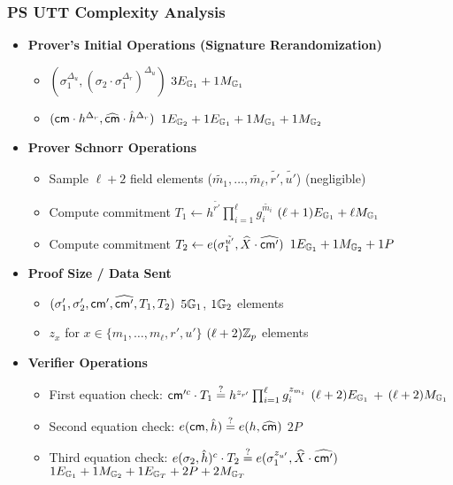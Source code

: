 {\subsubsection{PS UTT Complexity Analysis \cite{tomescu2022utt}}
\begin{itemize}
    \item \textbf{Prover's Initial Operations (Signature Rerandomization)}
    \begin{itemize}
        \item $(\sigma_1^{\Delta_u}, (\sigma_2\cdot \sigma_1^{\Delta_r})^{\Delta_u})$ \qquad $3E_{\mathbb{G}_1} + 1M_{\mathbb{G}_1}$
        \item $(\mathsf{cm} \cdot h^{\Delta_r}, \widehat{\mathsf{cm}} \cdot \hat{h}^{\Delta_r})$ \qquad $1E_{\mathbb{G}_2} + 1E_{\mathbb{G}_1} + 1M_{\mathbb{G}_1} + 1M_{\mathbb{G}_2}$
    \end{itemize}
\item \textbf{Prover Schnorr Operations}
    \begin{itemize}
        \item Sample $\ell+2$ field elements ($\tilde{m_1},\ldots,\tilde{m_\ell}, \tilde{r'}, \tilde{u'}$) \qquad (negligible)
        \item Compute commitment $T_1 \gets h^{\tilde{r'}} \prod_{i=1}^\ell g_i^{\tilde{m_i}}$ \qquad $(\ell + 1)E_{\mathbb{G}_1} + \ell M_{\mathbb{G}_1}$
        \item Compute commitment $T_2 \gets e(\sigma_1^{\tilde{u'}}, \widehat{X} \cdot \widehat{\mathsf{cm}'})$ \qquad $1E_{\mathbb{G}_1} + 1M_{\mathbb{G}_2} + 1P$
    \end{itemize}
    
\item \textbf{Proof Size / Data Sent}
    \begin{itemize}
        \item $(\sigma_1', \sigma_2', \mathsf{cm}', \widehat{\mathsf{cm}'}, T_1, T_2)$ \qquad $5\mathbb{G}_1$, $1\mathbb{G}_2$ elements
        \item $z_x$ for $x \in \{m_1,\ldots,m_\ell, r', u'\}$ \qquad $(\ell+2)\mathbb{Z}_p$ elements
    \end{itemize}
    
\item \textbf{Verifier Operations}
    \begin{itemize}
        \item First equation check: $\mathsf{cm}'^c \cdot T_1 \stackrel{?}{=} h^{z_{r'}} \prod_{i=1}^\ell g_i^{z_{m_i}}$ \qquad $(\ell + 2) E_{\mathbb{G}_1}$ + $(\ell + 2) M_{\mathbb{G}_1}$
        \item Second equation check: $e(\mathsf{cm}, \hat{h}) \stackrel{?}{=} e(h, \widehat{\mathsf{cm}})$ \qquad $2P$
        \item Third equation check: $e(\sigma_2, \hat{h})^c \cdot T_2 \stackrel{?}{=} e(\sigma_1^{z_{u'}}, \widehat{X} \cdot \widehat{\mathsf{cm}'})$ \qquad $ 1E_{\mathbb{G}_1} + 1M_{\mathbb{G}_2} + 1E_{\mathbb{G}_T} + 2P + 2M_{\mathbb{G}_T} $
    \end{itemize}
\end{itemize}

}

